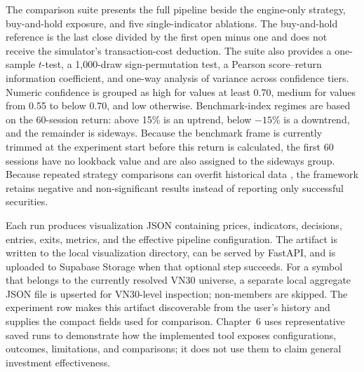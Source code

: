 The comparison suite presents the full pipeline beside the engine-only strategy, buy-and-hold exposure, and five single-indicator ablations. The buy-and-hold reference is the last close divided by the first open minus one and does not receive the simulator's transaction-cost deduction. The suite also provides a one-sample $t$-test, a 1,000-draw sign-permutation test, a Pearson score--return information coefficient, and one-way analysis of variance across confidence tiers. Numeric confidence is grouped as high for values at least 0.70, medium for values from 0.55 to below 0.70, and low otherwise. Benchmark-index regimes are based on the 60-session return: above 15\% is an uptrend, below $-15\%$ is a downtrend, and the remainder is sideways. Because the benchmark frame is currently trimmed at the experiment start before this return is calculated, the first 60 sessions have no lookback value and are also assigned to the sideways group. Because repeated strategy comparisons can overfit historical data \cite{bailey2017pbo}, the framework retains negative and non-significant results instead of reporting only successful securities.

Each run produces visualization JSON containing prices, indicators, decisions, entries, exits, metrics, and the effective pipeline configuration. The artifact is written to the local visualization directory, can be served by FastAPI, and is uploaded to Supabase Storage when that optional step succeeds. For a symbol that belongs to the currently resolved VN30 universe, a separate local aggregate JSON file is upserted for VN30-level inspection; non-members are skipped. The experiment row makes this artifact discoverable from the user's history and supplies the compact fields used for comparison. Chapter~6 uses representative saved runs to demonstrate how the implemented tool exposes configurations, outcomes, limitations, and comparisons; it does not use them to claim general investment effectiveness.
